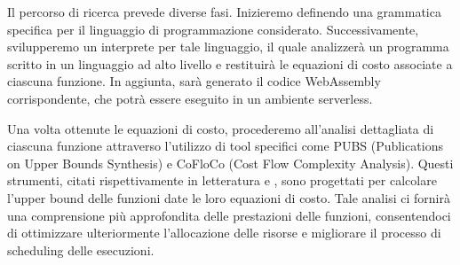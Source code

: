 \documentclass[../../main.tex]{subfiles}
\begin{document}
Il percorso di ricerca prevede diverse fasi. Inizieremo definendo una grammatica specifica per il linguaggio di programmazione considerato. Successivamente, svilupperemo un interprete per tale linguaggio, il quale analizzerà un programma scritto in un linguaggio ad alto livello e restituirà le equazioni di costo associate a ciascuna funzione. In aggiunta, sarà generato il codice WebAssembly corrispondente, che potrà essere eseguito in un ambiente serverless.

Una volta ottenute le equazioni di costo, procederemo all'analisi dettagliata di ciascuna funzione attraverso l'utilizzo di tool specifici come PUBS (Publications on Upper Bounds Synthesis) e CoFloCo (Cost Flow Complexity Analysis). Questi strumenti, citati rispettivamente in letteratura \autocite{albert2008automatic} e \autocite{flores2014resource}, sono progettati per calcolare l'upper bound delle funzioni date le loro equazioni di costo. Tale analisi ci fornirà una comprensione più approfondita delle prestazioni delle funzioni, consentendoci di ottimizzare ulteriormente l'allocazione delle risorse e migliorare il processo di scheduling delle esecuzioni.
\end{document}
